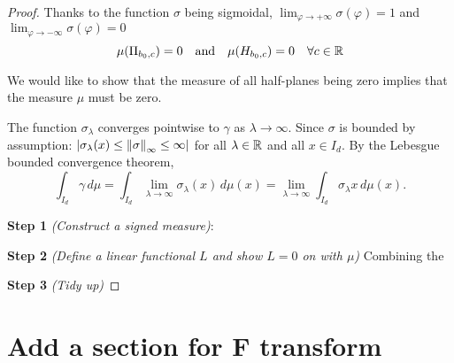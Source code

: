 \begin{proof}
    Thanks to the function $\sigma$ being sigmoidal, $\lim_{\varphi\to +\infty}
    \sigma(\varphi)= 1$ and $\lim_{\varphi\to -\infty} \sigma(\varphi)=0$
    \begin{equation}
        \mu(\Pi_{b_0, c}) = 0 \quad \text{and} \quad \mu (H_{b_0, c}) = 0 
        \quad \forall c\in\mathbb{R}
    \end{equation}
    
    We would like to show that the measure of all half-planes being zero implies
    that the measure $\mu$ must be zero.
    
    The function $\sigma_{\lambda}$ converges pointwise to $\gamma$ as $\lambda
    \to \infty$. Since $\sigma$ is bounded by assumption:
    $\left| \sigma_{\lambda}(x) \leq \left\| \sigma \right\|_{\infty} \leq \infty \right|$ for all
    $\lambda \in \mathbb{R}$ and all $x \in I_d$. By the Lebesgue bounded convergence
    theorem,
    \begin{equation}
        \int_{I_d} \gamma \,d\mu 
        = \int_{I_d} \lim_{\lambda\to\infty} \sigma_{\lambda}(x) \,d\mu(x)
        = \lim_{\lambda\to\infty} \int_{I_d} \sigma_{\lambda}{x} \,d\mu(x).
    \end{equation}


    \textbf{Step 1} \textit{(Construct a signed measure)}:

    \textbf{Step 2} \textit{(Define a linear functional $L$ and show $L = 0$ on
    with $\mu$)} Combining the 

    \textbf{Step 3} \textit{(Tidy up)}

\end{proof}





\section{Add a section for F transform}

